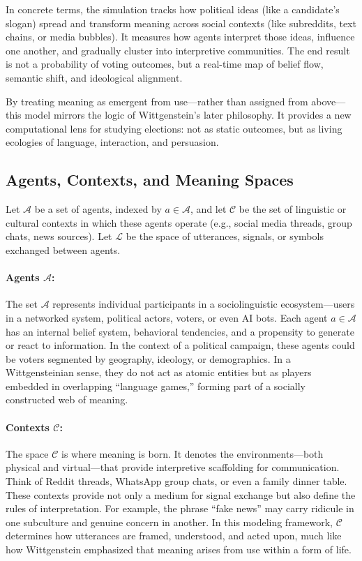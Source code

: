In concrete terms, the simulation tracks how political ideas (like a candidate’s slogan) spread and transform meaning across social contexts (like subreddits, text chains, or media bubbles). It measures how agents interpret those ideas, influence one another, and gradually cluster into interpretive communities. The end result is not a probability of voting outcomes, but a real-time map of belief flow, semantic shift, and ideological alignment.

By treating meaning as emergent from use—rather than assigned from above—this model mirrors the logic of Wittgenstein’s later philosophy. It provides a new computational lens for studying elections: not as static outcomes, but as living ecologies of language, interaction, and persuasion.


\subsection{Agents, Contexts, and Meaning Spaces}

Let \( \mathcal{A} \) be a set of agents, indexed by \( a \in \mathcal{A} \), and let \( \mathcal{C} \) be the set of linguistic or cultural contexts in which these agents operate (e.g., social media threads, group chats, news sources). Let \( \mathcal{L} \) be the space of utterances, signals, or symbols exchanged between agents.

\paragraph{Agents \( \mathcal{A} \):}
The set \( \mathcal{A} \) represents individual participants in a sociolinguistic ecosystem—users in a networked system, political actors, voters, or even AI bots. Each agent \( a \in \mathcal{A} \) has an internal belief system, behavioral tendencies, and a propensity to generate or react to information. In the context of a political campaign, these agents could be voters segmented by geography, ideology, or demographics. In a Wittgensteinian sense, they do not act as atomic entities but as players embedded in overlapping “language games,” forming part of a socially constructed web of meaning.

\paragraph{Contexts \( \mathcal{C} \):}
The space \( \mathcal{C} \) is where meaning is born. It denotes the environments—both physical and virtual—that provide interpretive scaffolding for communication. Think of Reddit threads, WhatsApp group chats, or even a family dinner table. These contexts provide not only a medium for signal exchange but also define the rules of interpretation. For example, the phrase “fake news” may carry ridicule in one subculture and genuine concern in another. In this modeling framework, \( \mathcal{C} \) determines how utterances are framed, understood, and acted upon, much like how Wittgenstein emphasized that meaning arises from use within a form of life.

